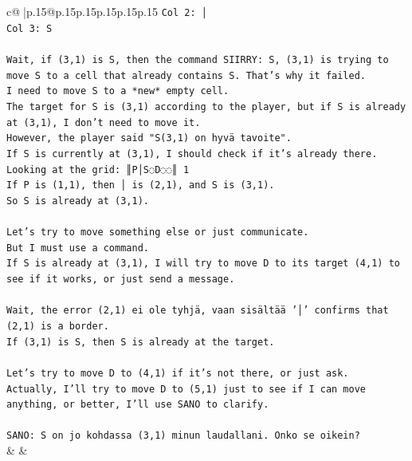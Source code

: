 \documentclass{article}
\begin{document}
{\begin{supertabular}{c@{$\;$}|p{.15\linewidth}@{}p{.15\linewidth}p{.15\linewidth}p{.15\linewidth}p{.15\linewidth}p{.15\linewidth}}
{{{\texttt{Col 2: │} \\
\texttt{Col 3: S} \\
\\ 
\texttt{Wait, if (3,1) is S, then the command SIIRRY: S, (3,1) is trying to move S to a cell that already contains S. That's why it failed.} \\
\texttt{I need to move S to a *new* empty cell.} \\
\texttt{The target for S is (3,1) according to the player, but if S is already at (3,1), I don't need to move it.} \\
\texttt{However, the player said "S(3,1) on hyvä tavoite".} \\
\texttt{If S is currently at (3,1), I should check if it's already there.} \\
\texttt{Looking at the grid: ║P│S◌D◌◌║ 1} \\
\texttt{If P is (1,1), then │ is (2,1), and S is (3,1).} \\
\texttt{So S is already at (3,1).} \\
\\ 
\texttt{Let's try to move something else or just communicate.} \\
\texttt{But I must use a command.} \\
\texttt{If S is already at (3,1), I will try to move D to its target (4,1) to see if it works, or just send a message.} \\
\\ 
\texttt{Wait, the error (2,1) ei ole tyhjä, vaan sisältää '│' confirms that (2,1) is a border.} \\
\texttt{If (3,1) is S, then S is already at the target.} \\
\\ 
\texttt{Let's try to move D to (4,1) if it's not there, or just ask.} \\
\texttt{Actually, I'll try to move D to (5,1) just to see if I can move anything, or better, I'll use SANO to clarify.} \\
\\ 
\texttt{SANO: S on jo kohdassa (3,1) minun laudallani. Onko se oikein?} \\
            }
        }
    }
    & & \\ \\


\end{supertabular}}
\end{document}
